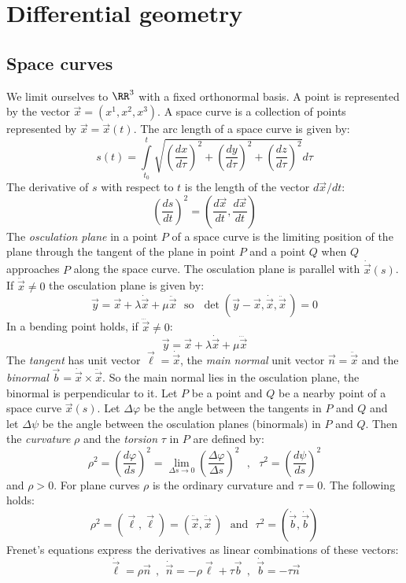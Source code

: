 \section{Differential geometry}
\subsection{Space curves}
We limit ourselves to $\RR^3$ with a fixed orthonormal basis. A point is
represented by the vector $\vec{x}=(x^1,x^2,x^3)$. A space curve is a
collection of points represented by $\vec{x}=\vec{x}(t)$. The arc length of a
space curve is given by:
\[
s(t)=\int\limits_{t_0}^t\sqrt{\left(\frac{dx}{d\tau}\right)^2+\left(\frac{dy}{d\tau}\right)^2+\left(\frac{dz}{d\tau}\right)^2}d\tau
\]
The derivative of $s$ with respect to $t$ is the length of the vector $d\vec{x}/dt$:
\[
\left(\frac{ds}{dt}\right)^2=\left(\frac{d\vec{x}}{dt},\frac{d\vec{x}}{dt}\right)
\]
The {\it osculation plane} in a point $P$ of a space curve is the limiting
position of the plane through the tangent of the plane in point $P$ and a point
$Q$ when $Q$ approaches $P$ along the space curve. The osculation plane is
parallel with $\dot{\vec{x}}(s)$. If $\ddot{\vec{x}}\neq0$ the osculation
plane is given by:
\[
\vec{y}=\vec{x}+\lambda\dot{\vec{x}}+\mu\ddot{\vec{x}}~~~\mbox{so}~~~
\det(\vec{y}-\vec{x},\dot{\vec{x}},\ddot{\vec{x}}\,)=0
\]
In a bending point holds, if $\dddot{\vec{x}}\neq0$:
\[
\vec{y}=\vec{x}+\lambda\dot{\vec{x}}+\mu\dddot{\vec{x}}
\]
The {\it tangent} has unit vector $\vec{\ell}=\dot{\vec{x}}$, the
{\it main normal} unit vector $\vec{n}=\ddot{\vec{x}}$ and the
{\it binormal} $\vec{b}=\dot{\vec{x}}\times\ddot{\vec{x}}$. So the main normal
lies in the osculation plane, the binormal is perpendicular to it.
\npar
Let $P$ be a point and $Q$ be a nearby point of a space curve $\vec{x}(s)$.
Let $\Delta\varphi$ be the angle between the tangents in $P$ and $Q$ and let
$\Delta\psi$ be the angle between the osculation planes (binormals) in $P$ and
$Q$. Then the {\it curvature} $\rho$ and the {\it torsion} $\tau$ in $P$ are
defined by:
\[
\rho^2=\left(\frac{d\varphi}{ds}\right)^2=\lim_{\Delta s\rightarrow0}\left(\frac{\Delta\varphi}{\Delta s}\right)^2~~~,~~~
\tau^2=\left(\frac{d\psi}{ds}\right)^2
\]
and $\rho>0$. For plane curves $\rho$ is the ordinary curvature and
$\tau=0$. The following holds:
\[
\rho^2=(\vec{\ell},\vec{\ell})=(\ddot{\vec{x}},\ddot{\vec{x}}\,)~~~\mbox{and}~~~
\tau^2=(\dot{\vec{b}},\dot{\vec{b}})
\]
Frenet's equations express the derivatives as linear combinations of these
vectors:
\[
\dot{\vec{\ell}}=\rho\vec{n}~~,~~\dot{\vec{n}}=-\rho\vec{\ell}+\tau\vec{b}~~,~~
\dot{\vec{b}}=-\tau\vec{n}
\]

